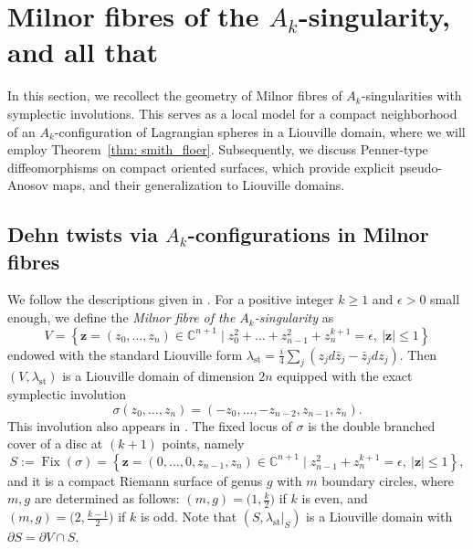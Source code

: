 \documentclass[12pt]{article}
\renewcommand{\le}{\leqslant}
\renewcommand{\ge}{\geqslant}
\theoremstyle{theorem}
\newtheorem{proposition}[theorem]{Proposition}
\theoremstyle{definition}
\theoremstyle{remark}
\numberwithin{equation}{section}
\newcommand{\ow}{\omega}
\newcommand{\p}{\partial}
\newcommand{\C}{{\mathbb{C}}}
\DeclareMathOperator{\Gr}{Gr}
\DeclareMathOperator{\Symp}{Symp}
\DeclareMathOperator{\Fix}{Fix}
\DeclareMathOperator{\st}{st}
\begin{document}

\section{Milnor fibres of the $A_k$-singularity, and all that}\label{sec: milnorfibre}
In this section, we recollect the geometry of Milnor fibres of $A_k$-singularities with symplectic involutions.
This serves as a local model for a compact neighborhood of an $A_k$-configuration of Lagrangian spheres in a Liouville domain, where we will employ Theorem~\ref{thm: smith_floer}.
Subsequently, we discuss Penner-type diffeomorphisms on compact oriented surfaces, which provide explicit pseudo-Anosov maps, and their generalization to Liouville domains.
\subsection{Dehn twists via $A_k$-configurations in Milnor fibres}\label{sec: milnorfibres}
We follow the descriptions given in \cite[Section~6c]{KhSe02}.
For a positive integer  $k\ge 1$ and $\epsilon>0$ small enough, we define the \emph{Milnor fibre of the $A_k$-singularity} as
$$
V=\left\{\boldsymbol{z}=(z_0,\dots,z_n)\in \C^{n+1} \mid   z_0^2+\dots+z_{n-1}^2+z_n^{k+1}=\epsilon,\ |\boldsymbol{z}|\le 1 \right\}
$$
endowed with the standard Liouville form $\lambda_{\st}=\frac{i}{4}\sum_j(z_jd\bar{z}_j-\bar{z}_jdz_j)$.
Then $(V,\lambda_{\st})$ is a Liouville domain of dimension $2n$ equipped with the exact symplectic involution
\begin{equation}\label{eq: involution}
\sigma(z_0,\dots,z_n) = (-z_0,\dots,-z_{n-2},z_{n-1},z_n).	
\end{equation}
This involution also appears in \cite[Lemma~6.14]{KhSe02}.
The fixed locus of $\sigma$ is the double branched cover of a disc at $(k+1)$ points, namely
$$
S:=\Fix(\sigma)=\left\{\boldsymbol{z}=(0,\dots,0,z_{n-1},z_n)\in \C^{n+1} \mid z_{n-1}^2 + z_n^{k+1} = \epsilon,\ |\boldsymbol{z}|\le 1 \right\},
$$
and it is a compact Riemann surface of genus $g$ with $m$ boundary circles, where $m,g$ are determined as follows: $\displaystyle(m,g)=\Big(1,\frac{k}{2}\Big)$ if $k$ is even, and $\displaystyle(m,g)=\Big(2,\frac{k-1}{2}\Big)$ if $k$ is odd. 
Note that $(S,\lambda_{\st}|_S)$ is a Liouville domain with $\p S=\p V\cap S$.
\end{document}
